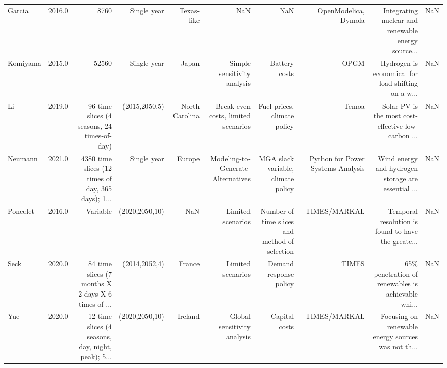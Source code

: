 \begin{tabular}{lrrrrrrrrr}
      Garcia & 2016.0 &                                               8760 &     Single year &                            Texas-like &                                                NaN &                                                NaN &              OpenModelica, Dymola & Integrating nuclear and renewable energy source... &     NaN \\
    Komiyama & 2015.0 &                                              52560 &     Single year &                                 Japan &                        Simple sensitivity analysis &                                      Battery costs &                              OPGM & Hydrogen is economical for load shifting on a w... &     NaN \\
          Li & 2019.0 &        96 time slices (4 seasons, 24 times-of-day) &   (2015,2050,5) &                        North Carolina &                Break-even costs, limited scenarios &                        Fuel prices, climate policy &                             Temoa & Solar PV is the most cost-effective low-carbon ... &     NaN \\
     Neumann & 2021.0 & 4380 time slices (12 times of day, 365 days); 1... &     Single year &                                Europe &                  Modeling-to-Generate-Alternatives &                 MGA slack variable, climate policy & Python for Power Systems Analysis & Wind energy and hydrogen storage are essential ... &     NaN \\
    Poncelet & 2016.0 &                                           Variable &  (2020,2050,10) &                                   NaN &                                  Limited scenarios &      Number of time slices and method of selection &                      TIMES/MARKAL & Temporal resolution is found to have the greate... &     NaN \\
        Seck & 2020.0 & 84 time slices (7 months X 2 days X 6 times of ... &   (2014,2052,4) &                                France &                                  Limited scenarios &                             Demand response policy &                             TIMES & 65\% penetration of renewables is achievable whi... &     NaN \\
         Yue & 2020.0 & 12 time slices (4 seasons, day, night, peak); 5... &  (2020,2050,10) &                               Ireland &                        Global sensitivity analysis &                                      Capital costs &                      TIMES/MARKAL & Focusing on renewable energy sources was not th... &     NaN \\
\bottomrule
\end{tabular}
